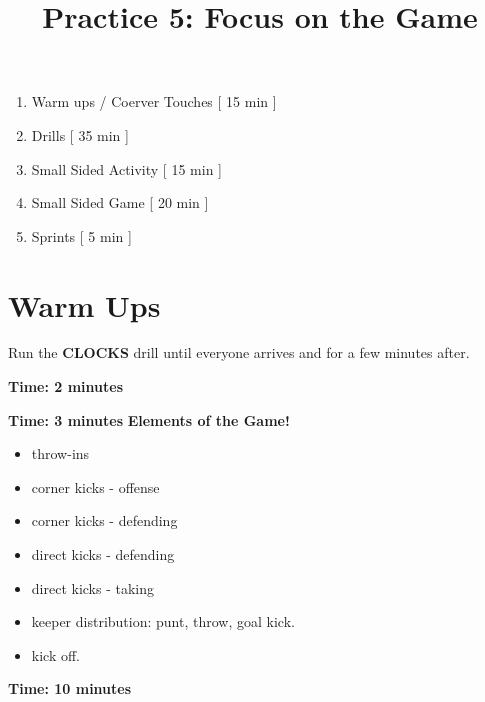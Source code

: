 \documentclass[10pt,letterpaper]{article}
\title{\vspace{-.5in}Practice 5: Focus on the Game}
\author{\vspace{-.5in}}
\date{\vspace{-.5in}}
\newenvironment{agendablock}[1]{%
    \tcolorbox[beamer,%
    noparskip,breakable,
    colback=LightGray,colframe=Black,%
    colbacklower=Gray!75!LightGray,%
    title=#1]}%
    {\endtcolorbox}
\newenvironment{myalertblock}[1]{%
    \tcolorbox[beamer,%
    noparskip,breakable,
    colback=LightCoral,colframe=DarkRed,%
    colbacklower=Tomato!75!LightCoral,%
    title=#1]}%
    {\endtcolorbox}
\begin{document}
\selectfont


\maketitle

\begin{agendablock}{Practice Activities}
    \begin{enumerate}
        \item Warm ups / Coerver Touches [ 15 min ]
        \item Drills [ 35 min ]
        \item Small Sided Activity [ 15 min ]
        \item Small Sided Game [ 20 min ]
        \item Sprints [ 5 min ] 
    \end{enumerate}
\end{agendablock}

\section{Warm Ups}
Run the \textbf{CLOCKS} drill until everyone arrives and for a few minutes after.

\textbf{Time: 2 minutes}


\textbf{Time: 3 minutes}
\begin{myalertblock}{Theme of the Practice}
    \textbf{Elements of the Game!}

    \begin{itemize}
        \setlength{\itemsep}{0pt}
        \setlength{\parskip}{0pt}
        \setlength{\parsep}{0pt}
        \item throw-ins
        \item corner kicks - offense
        \item corner kicks - defending
        \item direct kicks - defending
        \item direct kicks - taking
        \item keeper distribution: punt, throw, goal kick.
        \item kick off.
    \end{itemize}
\end{myalertblock}

\textbf{Time: 10 minutes}


\clearpage
\end{document}
